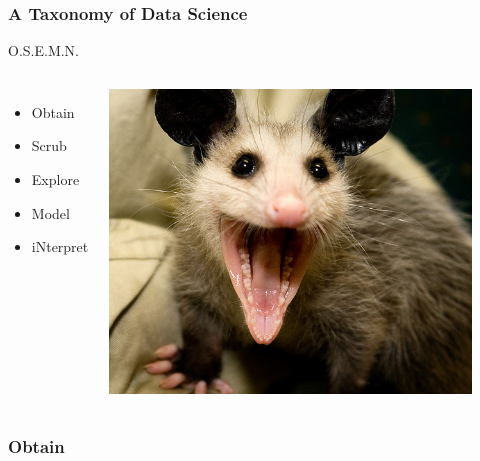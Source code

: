 \documentclass[xcolor=dvipsnames, 9pt]{beamer}
\begin{document}
\begin{frame}
    \frametitle{A Taxonomy of Data Science}
    
    \begin{center}
        \huge{O.S.E.M.N.}
        \vspace{1em}
        \begin{columns}[c] 
            \begin{itemize}
                \item Obtain
                \item Scrub
                \item Explore
                \item Model
                \item iNterpret
            \end{itemize}
\includegraphics[width=0.9\textwidth]{possum.png}
\end{columns}            
        
    \end{center}
\end{frame}

{
\begin{frame}
    \frametitle{Obtain}
\end{frame}
}
\end{document}
